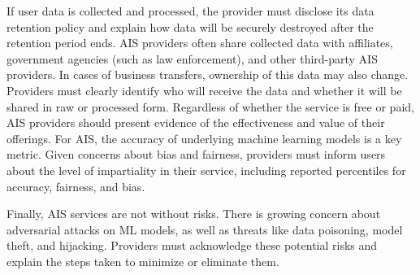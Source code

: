 \documentclass[manuscript,screen,review]{acmart}
\begin{document}
	If user data is collected and processed, the provider must disclose its data retention policy and explain how data will be securely destroyed after the retention period ends. AIS providers often share collected data with affiliates, government agencies (such as law enforcement), and other third-party AIS providers. In cases of business transfers, ownership of this data may also change. Providers must clearly identify who will receive the data and whether it will be shared in raw or processed form.	Regardless of whether the service is free or paid, AIS providers should present evidence of the effectiveness and value of their offerings. For AIS, the accuracy of underlying machine learning models is a key metric. Given concerns about bias and fairness, providers must inform users about the level of impartiality in their service, including reported percentiles for accuracy, fairness, and bias.

	Finally, AIS services are not without risks. There is growing concern about adversarial attacks on ML models, as well as threats like data poisoning, model theft, and hijacking. Providers must acknowledge these potential risks and explain the steps taken to minimize or eliminate them.



\end{document}

